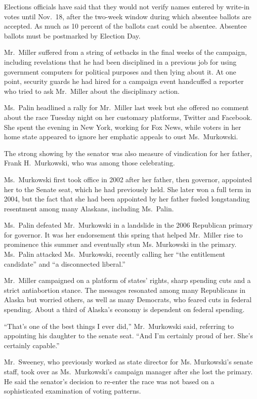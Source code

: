 ﻿\documentclass[12pt]{article}
\begin{document}
Elections officials have said that they would not verify names entered by write-in votes until
Nov.~18, after the two-week window during which absentee ballots are accepted. As much as 10 percent
of the ballots cast could be absentee. Absentee ballots must be postmarked by Election Day.

Mr.~Miller suffered from a string of setbacks in the final weeks of the campaign, including
revelations that he had been disciplined in a previous job for using government computers for
political purposes and then lying about it. At one point, security guards he had hired for a
campaign event handcuffed a reporter who tried to ask Mr.~Miller about the disciplinary action.

Ms.~Palin headlined a rally for Mr.~Miller last week but she offered no comment about the race
Tuesday night on her customary platforms, Twitter and Facebook. She spent the evening in New York,
working for Fox News, while voters in her home state appeared to ignore her emphatic appeals to oust
Ms.~Murkowski.

The strong showing by the senator was also measure of vindication for her father, Frank
H.~Murkowski, who was among those celebrating.

Ms.~Murkowski first took office in 2002 after her father, then governor, appointed her to the Senate
seat, which he had previously held. She later won a full term in 2004, but the fact that she had
been appointed by her father fueled longstanding resentment among many Alaskans, including
Ms.~Palin.

Ms.~Palin defeated Mr.~Murkowski in a landslide in the 2006 Republican primary for governor. It was
her endorsement this spring that helped Mr.~Miller rise to prominence this summer and eventually
stun Ms. Murkowski in the primary. Ms.~Palin attacked Ms.~Murkowski, recently calling her ``the
entitlement candidate'' and ``a disconnected liberal.''

Mr.~Miller campaigned on a platform of states' rights, sharp spending cuts and a strict antiabortion
stance. The messages resonated among many Republicans in Alaska but worried others, as well as many
Democrats, who feared cuts in federal spending. About a third of Alaska's economy is dependent on
federal spending.

``That's one of the best things I ever did,'' Mr.~Murkowski said, referring to appointing his
daughter to the senate seat. ``And I'm certainly proud of her. She's certainly capable.''

Mr.~Sweeney, who previously worked as state director for Ms. Murkowski's senate staff, took over as
Ms.~Murkowski's campaign manager after she lost the primary. He said the senator's decision to
re-enter the race was not based on a sophisticated examination of voting patterns.
\end{document}
